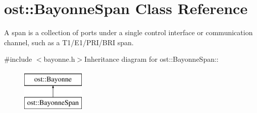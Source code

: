 \section{ost::BayonneSpan Class Reference}
\label{classost_1_1_bayonne_span}


A span is a collection of ports under a single control interface or communication channel, such as a T1/E1/PRI/BRI span.  


{\ttfamily \#include $<$bayonne.h$>$}Inheritance diagram for ost::BayonneSpan::\begin{figure}[H]
\begin{center}
\leavevmode
\includegraphics[height=2cm]{classost_1_1_bayonne_span}
\end{center}
\end{figure}
